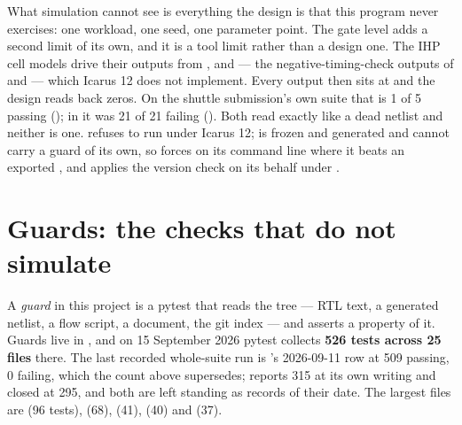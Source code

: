 What simulation cannot see is everything the design is that this program
never exercises: one workload, one seed, one parameter point. The gate
level adds a second limit of its own, and it is a tool limit rather than
a design one. The IHP cell models drive their outputs from
,  and  ---
the negative-timing-check outputs of  and
 --- which Icarus 12 does not implement. Every
 output then sits at  and the design
reads back zeros. On the shuttle submission's own suite that is 1 of 5
passing (); in  it was 21 of 21
failing (). Both read exactly like a dead
netlist and neither is one.  refuses to run
under Icarus 12;  is frozen and generated and cannot carry
a guard of its own, so  forces  on its
command line where it beats an exported , and applies
the version check on its behalf under .

\section{Guards: the checks that do not simulate}
\label{sec:verif-guards}

A \emph{guard} in this project is a pytest that reads the tree --- RTL
text, a generated netlist, a flow script, a document, the git index ---
and asserts a property of it. Guards live in , and on
15 September 2026 pytest collects \textbf{526 tests across 25 files}
there. The last recorded whole-suite run is 's
2026-09-11 row at 509 passing, 0 failing, which the count above
supersedes;  reports 315 at its own writing and
 closed at 295, and both are left standing as records of their
date. The largest files are  (96 tests),
 (68), 
(41),  (40) and 
(37).

